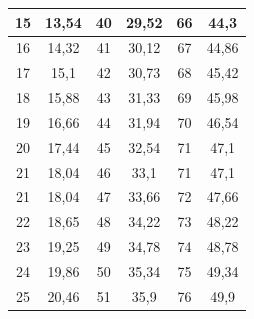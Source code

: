 \documentclass[12pt,openright,oneside,a4paper,brazil]{abntex2}
\begin{document}
\begin{table}[H]
\begin{tabular}{c | c| c | c |c | c}
            15 & 13,54 & 40 & 29,52 & 66 & 44,3 \\ \hline
            16 & 14,32 & 41 & 30,12 & 67 & 44,86 \\ \hline
            17 & 15,1 & 42 & 30,73 & 68 & 45,42 \\ \hline
            18 & 15,88 & 43 & 31,33 & 69 & 45,98 \\ \hline
            19 & 16,66 & 44 & 31,94 & 70 & 46,54 \\ \hline
            20 & 17,44 & 45 & 32,54 & 71 & 47,1 \\ \hline
            21 & 18,04 & 46 & 33,1 & 71 & 47,1 \\ \hline
            21 & 18,04 & 47 & 33,66 & 72 & 47,66 \\ \hline
            22 & 18,65 & 48 & 34,22 & 73 & 48,22 \\ \hline
            23 & 19,25 & 49 & 34,78 & 74 & 48,78 \\ \hline
            24 & 19,86 & 50 & 35,34 & 75 & 49,34 \\ \hline
            25 & 20,46 & 51 & 35,9 & 76 & 49,9 \\
            \hline
        \end{tabular}%
        
        \vspace{0.15cm}

\end{table}

\end{document}
